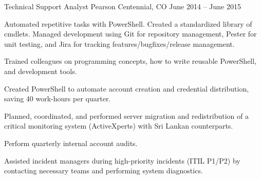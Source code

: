 \cventry
	{Technical Support Analyst} %
	{Pearson} %
	{Centennial, CO} %
	{June 2014 – June 2015} %
	{
	  	\begin{cvitems} %
	        \item {Automated repetitive tasks with PowerShell. Created a standardized library of cmdlets. Managed development using Git for repository management, Pester for unit testing, and Jira for tracking features/bugfixes/release management.}
			\item {Trained colleagues on programming concepts, how to write reusable PowerShell, and development tools.}
			\item {Created PowerShell to automate account creation and credential distribution, saving 40 work-hours per quarter.}
			\item {Planned, coordinated, and performed server migration and redistribution of a critical monitoring system (ActiveXperts) with Sri Lankan counterparts.}
			\item {Perform quarterly internal account audits.}
			\item {Assisted incident managers during high-priority incidents (ITIL P1/P2) by contacting necessary teams and performing system diagnostics.}
		\end{cvitems}
	}